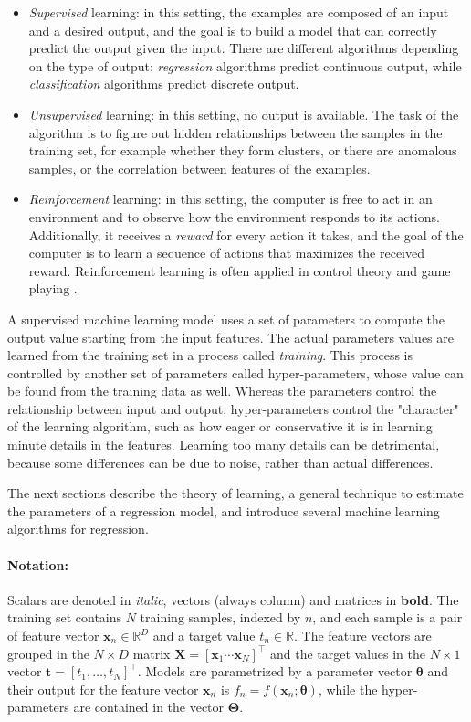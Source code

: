 \documentclass[a4paper,11pt]{kth-mag}
\begin{document}
\begin{itemize}
\item \emph{Supervised} learning: in this setting, the examples are composed of an input and a desired output, and the goal is to build a model that can correctly predict the output given the input. There are different algorithms depending on the type of output: \emph{regression} algorithms predict continuous output, while \emph{classification} algorithms predict discrete output.

\item \emph{Unsupervised} learning: in this setting, no output is available. The task of the algorithm is to figure out hidden relationships between the samples in the training set, for example whether they form clusters, or there are anomalous samples, or the correlation between features of the examples.

\item \emph{Reinforcement} learning: in this setting, the computer is free to act in an environment and to observe how the environment responds to its actions. Additionally, it receives a \emph{reward} for every action it takes, and the goal of the computer is to learn a sequence of actions that maximizes the received reward. Reinforcement learning is often applied in control theory \cite{rlcontrol} and game playing \citep{alphazero}.
\end{itemize}

A supervised machine learning model uses a set of parameters to compute the output value starting from the input features. The actual parameters values are learned from the training set in a process called \emph{training}. This process is controlled by another set of parameters called hyper-parameters, whose value can be found from the training data as well. Whereas the parameters control the relationship between input and output, hyper-parameters control the "character" of the learning algorithm, such as how eager or conservative it is in learning minute details in the features. Learning too many details can be detrimental, because some differences can be due to noise, rather than actual differences.

The next sections describe the theory of learning, a general technique to estimate the parameters of a regression model, and introduce several machine learning algorithms for regression.

\paragraph{Notation:} Scalars are denoted in \textit{italic}, vectors (always column) and matrices in \textbf{bold}. The training set contains $N$ training samples, indexed by $n$, and each sample is a pair of feature vector $\bm x_n\in\mathbb{R}^D$ and a target value $t_n\in\mathbb{R}$. The feature vectors are grouped in the $N\times D$ matrix $\bm X=\left[\bm x_1\dotsb\bm x_N\right]^\intercal$ and the target values in the $N\times 1$ vector $\bm t=\left[t_1,\ldots,t_N\right]^\intercal$. Models are parametrized by a parameter vector $\bm\theta$ and their output for the feature vector $\bm x_n$ is $f_n=f(\bm x_n;\bm\theta)$, while the hyper-parameters are contained in the vector $\bm\Theta$.
\end{document}
